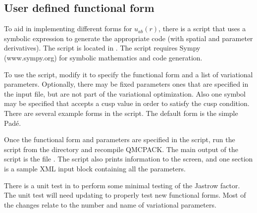 \documentclass[letterpaper,10pt,english]{sphinxmanual}
\begin{document}
\subsection{User defined functional form}
\label{\detokenize{intro_wavefunction:user-defined-functional-form}}\label{\detokenize{intro_wavefunction:jastrowuserform}}
To aid in implementing different forms for \(u_{ab}(r)\), there is a
script that uses a symbolic expression to generate the appropriate code
(with spatial and parameter derivatives). The script is located in
. The script
requires Sympy (www.sympy.org) for symbolic mathematics and code
generation.

To use the script, modify it to specify the functional form and a list
of variational parameters. Optionally, there may be fixed parameters \sphinxhyphen{}
ones that are specified in the input file, but are not part of the
variational optimization. Also one symbol may be specified that accepts
a cusp value in order to satisfy the cusp condition. There are several
example forms in the script. The default form is the simple Padé.

Once the functional form and parameters are specified in the script, run
the script from the  directory and recompile QMCPACK. The
main output of the script is the file
. The script also prints
information to the screen, and one section is a sample XML input block
containing all the parameters.

There is a unit test in
 to perform some
minimal testing of the Jastrow factor. The unit test will need updating
to properly test new functional forms. Most of the changes relate to the
number and name of variational parameters.
\end{document}
